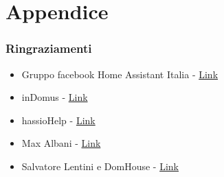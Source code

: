 \documentclass[hyperref={pdfpagelabels=false}]{beamer}
\begin{document}
	\section{Appendice}
	\begin{frame}
	\frametitle{Ringraziamenti}
	\begin{itemize}
		\item Gruppo facebook  Home Assistant Italia - \href{https://www.facebook.com/groups/147299622598134}{Link}
		\item inDomus - \href{https://indomus.it/}{Link}
		\item hassioHelp - \href{https://hassiohelp.eu/}{Link}
		\item Max Albani - \href{https://www.maxalbani.it/}{Link}
		\item Salvatore Lentini e DomHouse - \href{https://domhouse.it/}{Link}
	\end{itemize}
\end{frame}
\end{document}
